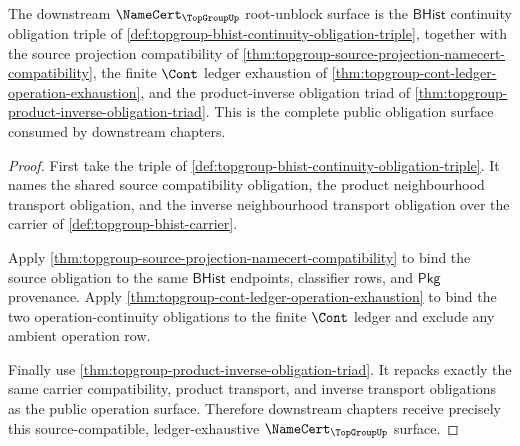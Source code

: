 \begin{theorem}
\label{thm:topgroup-downstream-root-unblock-surface}
The downstream $\NameCert_{\TopGroupUp}$ root-unblock surface is the
$\mathsf{BHist}$ continuity obligation triple of
\autoref{def:topgroup-bhist-continuity-obligation-triple}, together with the
source projection compatibility of
\autoref{thm:topgroup-source-projection-namecert-compatibility}, the finite
$\Cont$ ledger exhaustion of
\autoref{thm:topgroup-cont-ledger-operation-exhaustion}, and the product-inverse
obligation triad of \autoref{thm:topgroup-product-inverse-obligation-triad}.
This is the complete public obligation surface consumed by downstream chapters.
\end{theorem}
\begin{proof}
First take the triple of
\autoref{def:topgroup-bhist-continuity-obligation-triple}. It names the shared
source compatibility obligation, the product neighbourhood transport
obligation, and the inverse neighbourhood transport obligation over the carrier
of \autoref{def:topgroup-bhist-carrier}.

Apply \autoref{thm:topgroup-source-projection-namecert-compatibility} to bind
the source obligation to the same $\mathsf{BHist}$ endpoints, classifier rows,
and $\mathsf{Pkg}$ provenance. Apply
\autoref{thm:topgroup-cont-ledger-operation-exhaustion} to bind the two
operation-continuity obligations to the finite $\Cont$ ledger and exclude any
ambient operation row.

Finally use \autoref{thm:topgroup-product-inverse-obligation-triad}. It repacks
exactly the same carrier compatibility, product transport, and inverse
transport obligations as the public operation surface. Therefore downstream
chapters receive precisely this source-compatible, ledger-exhaustive
$\NameCert_{\TopGroupUp}$ surface.
\end{proof}

